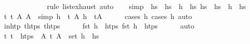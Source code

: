 \begin{isabellebody}
\ \ \ \ \ \isamarkupfalse%
\ {\isacharminus}{\kern0pt}\isanewline
\ \ \ \ \isamarkupfalse%
\ {\isacharparenleft}{\kern0pt}rule\ list{\isachardot}{\kern0pt}exhaust{\isacharcomma}{\kern0pt}\ auto{\isacharparenright}{\kern0pt}{\isacharplus}{\kern0pt}\isanewline
\isanewline
\ \ \isamarkupfalse%
\ {\isacharbrackleft}{\kern0pt}simp{\isacharbrackright}{\kern0pt}\ {\isacharequal}{\kern0pt}\ {\isacartoucheopen}hs\ {\isacharequal}{\kern0pt}\ hs{}\ {\isacharat}{\kern0pt}\ h\ {\isacharhash}{\kern0pt}\ hs{}{\isacartoucheclose}\ {\isacartoucheopen}hs{\isacharprime}{\kern0pt}\ {\isacharequal}{\kern0pt}\ hs{}{\isacharprime}{\kern0pt}\ {\isacharat}{\kern0pt}\ h{\isacharprime}{\kern0pt}\ {\isacharhash}{\kern0pt}\ hs{}{\isacharprime}{\kern0pt}{\isacartoucheclose}\isanewline
\isanewline
\ \ \isamarkupfalse%
\ t\ t{\isacharprime}{\kern0pt}\ A\ A{\isacharprime}{\kern0pt}\ \ {\isacharasterisk}{\kern0pt}{\isacharbrackleft}{\kern0pt}simp{\isacharbrackright}{\kern0pt}{\isacharcolon}{\kern0pt}\ {\isachardoublequoteopen}h\ {\isacharequal}{\kern0pt}\ {\isacharparenleft}{\kern0pt}t{\isacharcomma}{\kern0pt}\ A{\isacharparenright}{\kern0pt}{\isachardoublequoteclose}\ {\isachardoublequoteopen}h{\isacharprime}{\kern0pt}\ {\isacharequal}{\kern0pt}\ {\isacharparenleft}{\kern0pt}t{\isacharprime}{\kern0pt}{\isacharcomma}{\kern0pt}A{\isacharprime}{\kern0pt}{\isacharparenright}{\kern0pt}{\isachardoublequoteclose}\isanewline
\ \ \ \ \isamarkupfalse%
\ {\isacharparenleft}{\kern0pt}cases\ h{\isacharcomma}{\kern0pt}\ cases\ h{\isacharprime}{\kern0pt}{\isacharcomma}{\kern0pt}\ auto{\isacharparenright}{\kern0pt}\isanewline
\ \ \isamarkupfalse%
\ in{\isacharunderscore}{\kern0pt}htp{\isacharcolon}{\kern0pt}\ {\isachardoublequoteopen}t{\isasymin}htps{\isachardoublequoteclose}\ {\isachardoublequoteopen}t{\isacharprime}{\kern0pt}{\isasymin}htps{\isachardoublequoteclose}\isanewline
\ \ \ \ \isamarkupfalse%
\ {\isacartoucheopen}fst\ h\ {\isasymin}\ htps{\isacartoucheclose}\ {\isacartoucheopen}fst\ h{\isacharprime}{\kern0pt}\ {\isasymin}\ htps{\isacartoucheclose}\isanewline
\ \ \ \ \isamarkupfalse%
\ auto\isanewline
\ \ \isamarkupfalse%
\ \isamarkupfalse%
\ {\isachardoublequoteopen}{\isasymAnd}t{\isachardot}{\kern0pt}\ t\ {\isasymin}\ htps\ {\isasymLongrightarrow}\ {\isasymexists}A{\isachardot}{\kern0pt}\ {\isacharparenleft}{\kern0pt}t{\isacharcomma}{\kern0pt}\ A{\isacharparenright}{\kern0pt}\ {\isasymin}\ set\ {\isacharparenleft}{\kern0pt}h\ {\isacharhash}{\kern0pt}\ hs{}{\isacharparenright}{\kern0pt}{\isachardoublequoteclose}\isanewline

\end{isabellebody}
